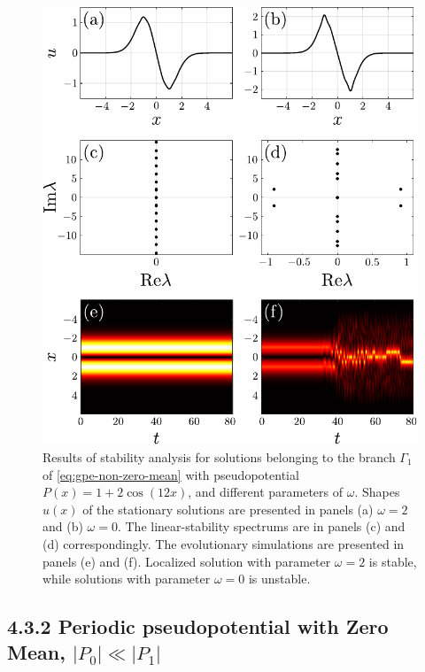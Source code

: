\begin{figure}[h]
\centering
	\includegraphics[scale = 1]{pic/stability, non-zero mean cosine nho}
	\caption{
		Results of stability analysis for solutions belonging to the branch $\Gamma_1$ of \eqref{eq:gpe-non-zero-mean} with pseudopotential $P(x) = 1 + 2 \cos (12 x)$, and different parameters of $\omega$.
		Shapes $u(x)$ of the stationary solutions are presented in panels (a) $\omega = 2$ and (b) $\omega = 0$.
		The linear-stability spectrums are in panels (c) and (d) correspondingly.
		The evolutionary simulations are presented in panels (e) and (f).
		Localized solution with parameter $\omega = 2$ is stable, while solutions with parameter $\omega = 0$ is unstable.
	}
\label{fig:stability-nho-non-zero-mean}
\end{figure}

\subsection*{4.3.2 Periodic pseudopotential with Zero Mean, $|P_0| \ll |P_1|$}

